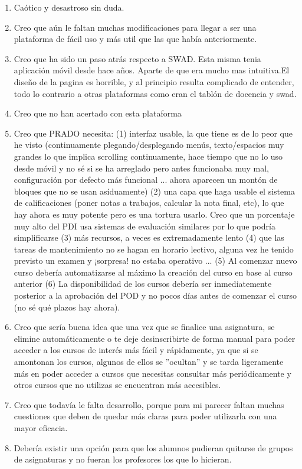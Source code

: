 \begin{enumerate}
\item Caótico y desastroso sin duda.
\item Creo que aún le faltan muchas modificaciones para llegar a ser una plataforma de fácil uso y más util que las que había anteriormente.
\item Creo que ha sido un paso atrás respecto a SWAD. Esta misma tenia aplicación móvil desde hace años. Aparte de que era mucho mas intuitiva.El diseño de la pagina es horrible, y al principio resulta complicado de entender, todo lo contrario a otras plataformas como eran el tablón de docencia y swad.
\item Creo que no han acertado con esta plataforma
\item Creo que PRADO necesita: (1) interfaz usable, la que tiene es de lo peor que he visto (continuamente plegando/desplegando menús, texto/espacios muy grandes lo que implica scrolling continuamente, hace tiempo que no lo uso desde móvil y no sé si se ha arreglado pero antes funcionaba muy mal, configuración por defecto más funcional ... ahora aparecen un montón de bloques que no se usan asíduamente) (2) una capa que haga usable el sistema de calificaciones (poner notas a trabajos, calcular la nota final, etc), lo que hay ahora es muy potente pero es una tortura usarlo. Creo que un porcentaje muy alto del PDI usa sistemas de evaluación similares por lo que podría simplificarse (3) más recursos, a veces es extremadamente lento (4) que las tareas de mantenimiento no se hagan en horario lectivo, alguna vez he tenido previsto un examen y ¡sorpresa! no estaba operativo ... (5) Al comenzar nuevo curso debería automatizarse al máximo la creación del curso en base al curso anterior (6) La disponibilidad de los cursos debería ser inmediatemente posterior a la aprobación del POD y no pocos días antes de comenzar el curso (no sé qué plazos hay ahora).
\item Creo que sería buena idea que una vez que se finalice una asignatura, se elimine automáticamente o te deje desinscribirte de forma manual para poder acceder a los cursos de interés más fácil y rápidamente, ya que si se amontonan los cursos, algunos de ellos se ''ocultan'' y se tarda ligeramente más en poder acceder a cursos que necesitas consultar más periódicamente y otros cursos que no utilizas se encuentran más accesibles.
\item Creo que todavía le falta desarrollo, porque para mi parecer faltan muchas cuestiones que deben de quedar más claras para poder utilizarla con una mayor eficacia.
\item Debería existir una opción para que los alumnos pudieran quitarse de grupos de asignaturas y no fueran los profesores los que lo hicieran.

\end{enumerate}
